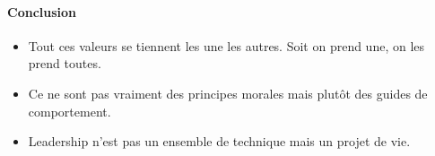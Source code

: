 \documentclass[11pt]{article} %
\begin{document}
\paragraph{Conclusion} 

\begin{itemize}
    \item Tout ces valeurs se tiennent les une les autres. Soit on prend
    une, on les prend toutes.
    \item Ce ne sont pas vraiment des principes morales mais plutôt des
    guides de comportement.
    \item Leadership n'est pas un ensemble de technique mais un projet
de vie.
\end{itemize}
\end{document}
